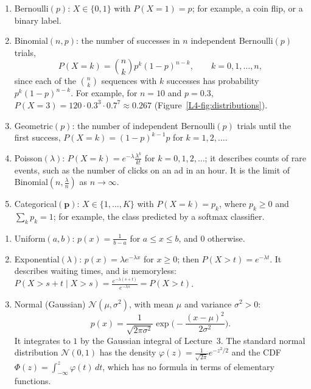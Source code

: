 \begin{example}\label{L4-ex:discrete}
    \begin{enumerate}
        \item Bernoulli$(p)$: $X \in \{0, 1\}$ with $P(X = 1) = p$; for example, a coin flip, or a binary label.
        \item Binomial$(n, p)$: the number of successes in $n$ independent Bernoulli$(p)$ trials,
        \[P(X = k) = \binom{n}{k} p^k (1 - p)^{n-k}, \qquad k = 0, 1, \ldots, n,\]
        since each of the $\binom{n}{k}$ sequences with $k$ successes has probability $p^k(1 - p)^{n-k}$. For example, for $n = 10$ and $p = 0.3$, $P(X = 3) = 120 \cdot 0.3^3 \cdot 0.7^7 \approx 0.267$ (Figure~\ref{L4-fig:distributions}).
        \item Geometric$(p)$: the number of independent Bernoulli$(p)$ trials until the first success, $P(X = k) = (1 - p)^{k-1}p$ for $k = 1, 2, \ldots$.
        \item Poisson$(\lambda)$: $P(X = k) = e^{-\lambda}\frac{\lambda^k}{k!}$ for $k = 0, 1, 2, \ldots$; it describes counts of rare events, such as the number of clicks on an ad in an hour. It is the limit of Binomial$(n, \frac{\lambda}{n})$ as $n \to \infty$.
        \item Categorical$(\mathbf{p})$: $X \in \{1, \ldots, K\}$ with $P(X = k) = p_k$, where $p_k \geq 0$ and $\sum_k p_k = 1$; for example, the class predicted by a softmax classifier.
    \end{enumerate}
\end{example}

\begin{example}\label{L4-ex:continuous}
    \begin{enumerate}
        \item Uniform$(a, b)$: $p(x) = \frac{1}{b - a}$ for $a \leq x \leq b$, and $0$ otherwise.
        \item Exponential$(\lambda)$: $p(x) = \lambda e^{-\lambda x}$ for $x \geq 0$; then $P(X > t) = e^{-\lambda t}$. It describes waiting times, and is memoryless: $P(X > s + t \mid X > s) = \frac{e^{-\lambda(s + t)}}{e^{-\lambda s}} = P(X > t)$.
        \item Normal (Gaussian) $\mathcal{N}(\mu, \sigma^2)$, with mean $\mu$ and variance $\sigma^2 > 0$:
        \[p(x) = \frac{1}{\sqrt{2\pi\sigma^2}} \exp\Big(-\frac{(x - \mu)^2}{2\sigma^2}\Big).\]
        It integrates to $1$ by the Gaussian integral of Lecture~3. The standard normal distribution $\mathcal{N}(0, 1)$ has the density $\varphi(z) = \frac{1}{\sqrt{2\pi}}e^{-z^2/2}$ and the CDF $\Phi(z) = \int_{-\infty}^z \varphi(t)\, dt$, which has no formula in terms of elementary functions.
    \end{enumerate}
\end{example}

